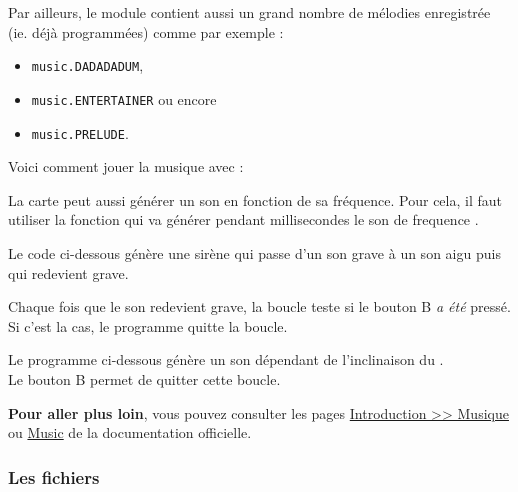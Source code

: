 Par ailleurs, le module   contient aussi un grand nombre de mélodies enregistrée (ie. déjà programmées) comme par exemple :
\begin{itemize}
    \item \texttt{music.DADADADUM},
    \item \texttt{music.ENTERTAINER} ou encore
    \item \texttt{music.PRELUDE}.
\end{itemize}


\begin{methode}
Voici comment jouer la musique  avec \mb :

\end{methode}

La carte \mb peut aussi générer un son en fonction de sa fréquence. Pour cela, il faut utiliser la fonction  qui va générer pendant  millisecondes le son de frequence .

\begin{methode}
    Le code ci-dessous génère une sirène qui passe d'un son grave à un son aigu puis qui redevient grave.\par
    Chaque fois que le son redevient grave, la boucle teste si le bouton B \emph{a été} pressé. Si c'est la cas, le programme quitte la boucle.
    
\end{methode}

\begin{methode}
    Le programme ci-dessous génère un son dépendant de l'inclinaison du \mb.\\
    Le bouton B permet de quitter cette boucle.
    
\end{methode}

\begin{remarque}
\textbf{Pour aller plus loin}, vous pouvez consulter les pages  \href{https://microbit-micropython.readthedocs.io/fr/latest/tutorials/music.html#}{Introduction >> Musique} ou \href{https://microbit-micropython.readthedocs.io/fr/latest/music.html#}{Music} de la documentation officielle.
\end{remarque}


\subsubsection{Les fichiers}

